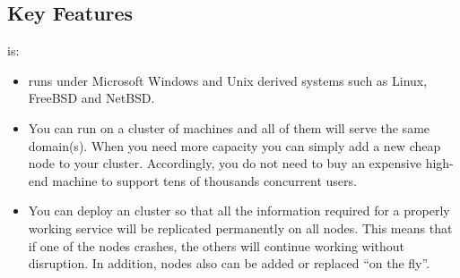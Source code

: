\newpage
\subsection{Key Features}
\label{sec:keyfeatures}


\ejabberd{} is:
\begin{itemize}
\item {} \ejabberd{} runs under Microsoft Windows and Unix derived systems such as Linux, FreeBSD and NetBSD.

\item {} You can run \ejabberd{} on a cluster of machines and all of them will serve the same \Jabber{} domain(s). When you need more capacity you can simply add a new cheap node to your cluster. Accordingly, you do not need to buy an expensive high-end machine to support tens of thousands concurrent users.

\item {} You can deploy an \ejabberd{} cluster so that all the information required for a properly working service will be replicated permanently on all nodes. This means that if one of the nodes crashes, the others will continue working without disruption. In addition, nodes also can be added or replaced ``on the fly''.


\end{itemize}
